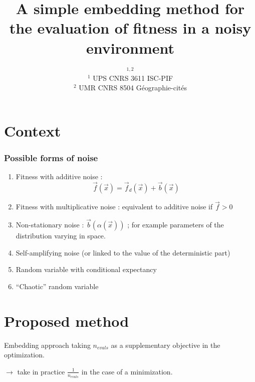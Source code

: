 


\title{A simple embedding method for the evaluation of fitness in a noisy environment}
\author{$^{1,2}$\\
$^1$ UPS CNRS 3611 ISC-PIF\\
$^2$ UMR CNRS 8504 G{\'e}ographie-cit{\'e}s
}
\date{}


\maketitle

\justify





\section{Context}


\subsubsection{Possible forms of noise}

\begin{enumerate}
\item Fitness with additive noise :
\[
\vec{f}(\vec{x}) = \vec{f}_d(\vec{x}) + \vec{b}(\vec{x})
\]
\item Fitness with multiplicative noise : equivalent to additive noise if $\vec{f} > 0$
\item Non-stationary noise : $\vec{b}(\alpha(\vec{x}))$ ; for example parameters of the distribution varying in space.
\item Self-amplifying noise (or linked to the value of the deterministic part)
\item Random variable with conditional expectancy
\item ``Chaotic'' random variable
\end{enumerate}




\section{Proposed method}

Embedding approach taking $n_{evals}$ as a supplementary objective in the optimization.

$\rightarrow$ take in practice $\frac{1}{n_{evals}}$ in the case of a minimization.



